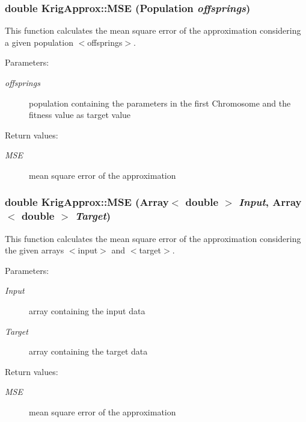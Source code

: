 \subsubsection{\setlength{\rightskip}{0pt plus 5cm}double Krig\-Approx::MSE (Population {\em offsprings})}\label{classKrigApprox_a4}


This function calculates the mean square error of the approximation considering a given population $<$offsprings$>$. 

\begin{Desc}
\item[Parameters:]
\begin{description}
\item[{\em offsprings}]population containing the parameters in the first Chromosome and the fitness value as target value \end{description}
\end{Desc}
\begin{Desc}
\item[Return values:]
\begin{description}
\item[{\em MSE}]mean square error of the approximation \end{description}
\end{Desc}
\subsubsection{\setlength{\rightskip}{0pt plus 5cm}double Krig\-Approx::MSE (Array$<$ double $>$ {\em Input}, Array$<$ double $>$ {\em Target})}\label{classKrigApprox_a3}


This function calculates the mean square error of the approximation considering the given arrays $<$input$>$ and $<$target$>$. 

\begin{Desc}
\item[Parameters:]
\begin{description}
\item[{\em Input}]array containing the input data \item[{\em Target}]array containing the target data \end{description}
\end{Desc}
\begin{Desc}
\item[Return values:]
\begin{description}
\item[{\em MSE}]mean square error of the approximation \end{description}
\end{Desc}
